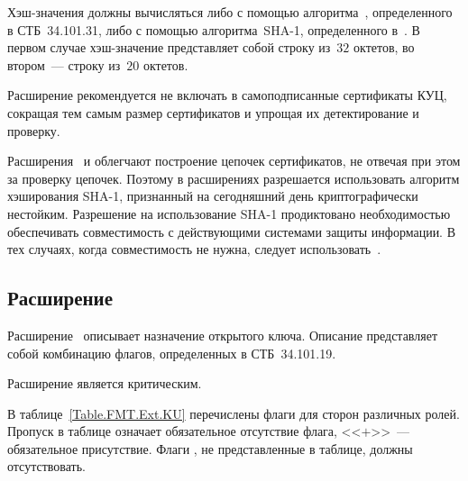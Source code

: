 Хэш-значения должны вычисляться либо с помощью алгоритма~,
определенного в СТБ~34.101.31, либо с помощью алгоритма~SHA-1, определенного
в~\cite{SHA1}. В первом случае хэш-значение представляет собой строку из~$32$
октетов, во втором~--- строку из~$20$ октетов.

\begin{note}
Расширение  рекомендуется не включать в 
самоподписанные сертификаты КУЦ, сокращая тем самым размер сертификатов и 
упрощая их детектирование и проверку.
\end{note}

\begin{note}
Расширения~ и  облегчают
построение цепочек сертификатов, не отвечая при этом за проверку цепочек.
Поэтому в расширениях разрешается использовать алгоритм хэширования SHA-1,
признанный на сегодняшний день криптографически нестойким. Разрешение на
использование SHA-1 продиктовано необходимостью обеспечивать совместимость с
действующими системами защиты информации. В тех случаях, когда совместимость не
нужна, следует использовать~.
\end{note}

\subsection{Расширение }\label{FMT.Ext.KU}

Расширение~ описывает назначение открытого ключа. Описание
представляет собой комбинацию флагов, определенных в СТБ~34.101.19.

Расширение является критическим.

В таблице~\ref{Table.FMT.Ext.KU} перечислены флаги  для сторон
различных ролей.
%
Пропуск в таблице означает обязательное отсутствие флага, <<$+$>>~---
обязательное присутствие.
%
Флаги , не представленные в таблице, должны отсутствовать.

